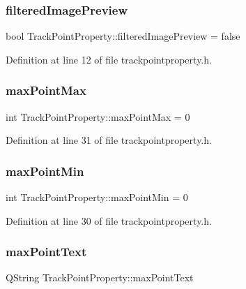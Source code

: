 \subsubsection{\texorpdfstring{filteredImagePreview}{filteredImagePreview}}
{\footnotesize\ttfamily bool Track\+Point\+Property\+::filtered\+Image\+Preview = false}



Definition at line 12 of file trackpointproperty.\+h.

\mbox{\label{struct_track_point_property_adf5aa732a275211bda36679366f83e0e}} 
\subsubsection{\texorpdfstring{maxPointMax}{maxPointMax}}
{\footnotesize\ttfamily int Track\+Point\+Property\+::max\+Point\+Max = 0}



Definition at line 31 of file trackpointproperty.\+h.

\mbox{\label{struct_track_point_property_ad2cc11151970cacb0f01f0dd2c39dcd4}} 
\subsubsection{\texorpdfstring{maxPointMin}{maxPointMin}}
{\footnotesize\ttfamily int Track\+Point\+Property\+::max\+Point\+Min = 0}



Definition at line 30 of file trackpointproperty.\+h.

\mbox{\label{struct_track_point_property_a8b8f1cded2ae7869d010e2d37c3292b8}} 
\subsubsection{\texorpdfstring{maxPointText}{maxPointText}}
{\footnotesize\ttfamily Q\+String Track\+Point\+Property\+::max\+Point\+Text}



